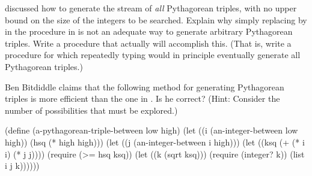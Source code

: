 \begin{exercise}
	\label{Exercise 4.36}
	 discussed how to generate the stream of \emph{all} Pythagorean triples, with no upper bound on the size of the integers to be searched.
	Explain why simply replacing  by  in the procedure in  is not an adequate way to generate arbitrary Pythagorean triples.
	Write a procedure that actually will accomplish this.
	(That is, write a procedure for which repeatedly typing  would in principle eventually generate all Pythagorean triples.)
\end{exercise}



\begin{exercise}
	\label{Exercise 4.37}
	Ben Bitdiddle claims that the following method for generating Pythagorean triples is more efficient than the one in .
	Is he correct?
	(Hint:
	Consider the number of possibilities that must be explored.)
	\begin{scheme}
	  (define (a-pythagorean-triple-between low high)
	    (let ((i (an-integer-between low high))
	          (hsq (* high high)))
	      (let ((j (an-integer-between i high)))
	        (let ((ksq (+ (* i i) (* j j))))
	          (require (>= hsq ksq))
	          (let ((k (sqrt ksq)))
	            (require (integer? k))
	            (list i j k))))))
	\end{scheme}
\end{exercise}
